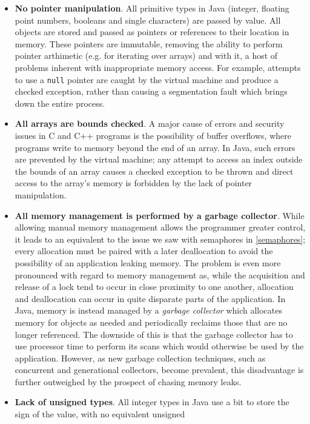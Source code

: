 \begin{itemize}
\item \textbf{No pointer manipulation}.  All primitive types in Java
  (integer, floating point numbers, booleans and single characters)
  are passed by value.  All objects are stored and passed as pointers
  or references to their location in memory.  These pointers are
  immutable, removing the ability to perform pointer arthimetic
  (e.g. for iterating over arrays) and with it, a host of problems
  inherent with inappropriate memory access.  For example, attempts to
  use a \texttt{null} pointer are caught by the virtual machine and
  produce a checked exception, rather than causing a segmentation
  fault which brings down the entire process.
\item \textbf{All arrays are bounds checked}.  A major cause of errors
  and security issues in C and C++ programs is the possibility of
  buffer overflows, where programs write to memory beyond the end of
  an array.  In Java, such errors are prevented by the virtual
  machine; any attempt to access an index outside the bounds of an
  array causes a checked exception to be thrown and direct access to
  the array's memory is forbidden by the lack of pointer manipulation.
\item \textbf{All memory management is performed by a garbage
  collector}.  While allowing manual memory management allows the
  programmer greater control, it leads to an equivalent to the issue
  we saw with semaphores in \ref{semaphores}; every allocation must be
  paired with a later deallocation to avoid the possibility of an
  application leaking memory.  The problem is even more pronounced
  with regard to memory management as, while the acquisition and
  release of a lock tend to occur in close proximity to one another,
  allocation and deallocation can occur in quite disparate parts of
  the application.  In Java, memory is instead managed by a
  \emph{garbage collector} which allocates memory for objects as
  needed and periodically reclaims those that are no longer
  referenced.  The downside of this is that the garbage collector has
  to use processor time to perform its scans which would otherwise be
  used by the application.  However, as new garbage collection
  techniques, such as concurrent and generational collectors, become
  prevalent, this disadvantage is further outweighed by the prospect
  of chasing memory leaks.
\item \textbf{Lack of unsigned types}.  All integer types in Java use
  a bit to store the sign of the value, with no equivalent unsigned

\end{itemize}
